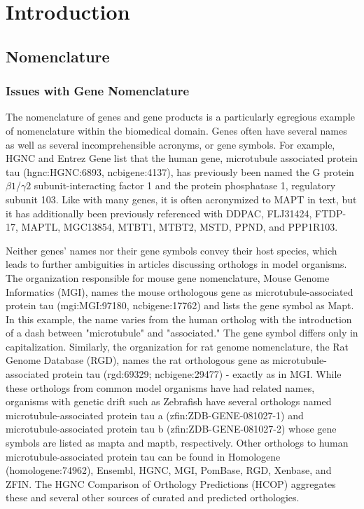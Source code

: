 \chapter{Introduction}

\section{Nomenclature}

\subsection{Issues with Gene Nomenclature}

The nomenclature of genes and gene products is a particularly egregious example of nomenclature within the biomedical domain.
Genes often have several names as well as several incomprehensible acronyms, or gene symbols.
For example, HGNC and Entrez Gene list that the human gene, microtubule associated protein tau (hgnc:HGNC:6893, ncbigene:4137), has previously been named the G protein
$\beta1$/$\gamma2$ subunit-interacting factor 1 and the protein phosphatase 1,
regulatory subunit 103.
Like with many genes, it is often acronymized to MAPT in text, but it has additionally been previously referenced with DDPAC, FLJ31424, FTDP-17, MAPTL, MGC13854, MTBT1, MTBT2, MSTD, PPND, and PPP1R103.

Neither genes' names nor their gene symbols convey their host species, which leads to further ambiguities in articles discussing orthologs in model organisms.
The organization responsible for mouse gene nomenclature, Mouse Genome Informatics (MGI), names the mouse orthologous gene as microtubule-associated protein tau (mgi:MGI:97180, ncbigene:17762) and lists the gene symbol as Mapt.
In this example, the name varies from the human ortholog with the introduction of a dash between "microtubule" and "associated."
The gene symbol differs only in capitalization.
Similarly, the organization for rat genome nomenclature, the Rat Genome Database (RGD), names the rat orthologous gene as microtubule-associated protein tau (rgd:69329; ncbigene:29477) - exactly as in MGI.
While these orthologs from common model organisms have had related names, organisms with genetic drift such as Zebrafish have several orthologs named microtubule-associated protein tau a (zfin:ZDB-GENE-081027-1) and microtubule-associated protein tau b (zfin:ZDB-GENE-081027-2) whose gene symbols are listed as mapta and maptb, respectively.
Other orthologs to human microtubule-associated protein tau can be found in Homologene (homologene:74962), Ensembl\cite{Zerbino2018}, HGNC, MGI, PomBase, RGD, Xenbase, and ZFIN.
The HGNC Comparison of Orthology Predictions (HCOP)\cite{Wright2005} aggregates these and several other sources of curated and predicted orthologies.

